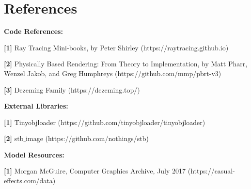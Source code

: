 \documentclass[utf8]{article}
\begin{document}
\section{References}
\noindent
\textbf{Code References: }

\noindent
\textbf{[1]} Ray Tracing Mini-books, by Peter Shirley (https://raytracing.github.io)

\noindent
\textbf{[2]} Physically Based Rendering: From Theory to Implementation, by Matt Pharr, Wenzel Jakob, and Greg Humphreys (https://github.com/mmp/pbrt-v3)

\noindent
\textbf{[3]} Dezeming Family (https://dezeming.top/)

\noindent
\textbf{External Libraries: }

\noindent
\textbf{[1]} Tinyobjloader (https://github.com/tinyobjloader/tinyobjloader)

\noindent
\textbf{[2]} stb$\_$image (https://github.com/nothings/stb)

\noindent
\textbf{Model Resources: }

\noindent
\textbf{[1]} Morgan McGuire, Computer Graphics Archive, July 2017 (https://casual-effects.com/data)
\end{document}
